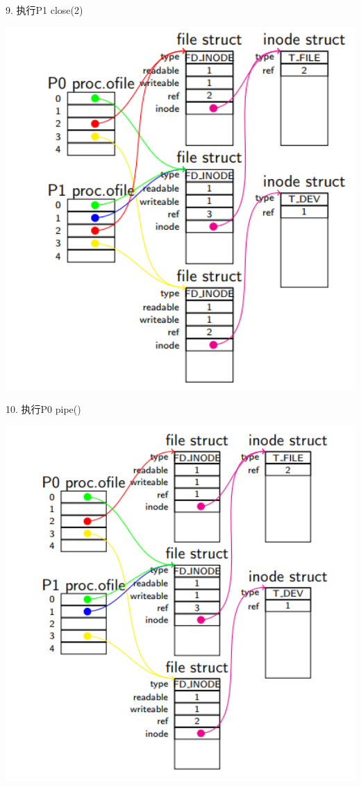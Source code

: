 9. 执行P1 close(2)

\includegraphics[width=6in]{figures/eg_file/image164.png}

10. 执行P0 pipe()

\includegraphics[width=6in]{figures/eg_file/image165.png}



